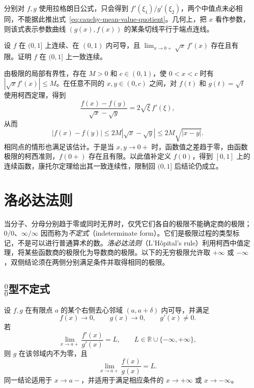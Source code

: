 \documentclass[UTF8,12pt,a4paper,fontset=fandol]{ctexbook}
\begin{document}
分别对 $f,g$ 使用拉格朗日公式，只会得到 $f'(\xi_1)/g'(\xi_2)$，两个中值点未必相同，不能据此推出式~\eqref{eq:cauchy-mean-value-quotient}。几何上，把 $x$ 看作参数，则该式表示参数曲线 $(g(x),f(x))$ 的某条切线平行于端点连线。

\begin{example}
\label{ex:cauchy-mean-value-weighted-derivative}
设 $f$ 在 $(0,1]$ 上连续、在 $(0,1)$ 内可导，且 $\lim_{x\to0+}\sqrt{x}\,f'(x)$ 存在且有限。证明 $f$ 在 $(0,1]$ 上一致连续。
\end{example}

\begin{solve}
由极限的局部有界性，存在 $M>0$ 和 $c\in(0,1)$，使 $0<x<c$ 时有 $|\sqrt{x}f'(x)|\leq M$。在任意不同的 $x,y\in(0,c)$ 之间，对 $f(t)$ 和 $g(t)=\sqrt{t}$ 使用柯西定理，得到
\[
    \frac{f(x)-f(y)}{\sqrt{x}-\sqrt{y}}=2\sqrt{\xi}\,f'(\xi),
\]
从而
\[
    |f(x)-f(y)|\leq2M|\sqrt{x}-\sqrt{y}|
    \leq2M\sqrt{|x-y|}.
\]
相同点的情形也满足该估计。于是当 $x,y\to0+$ 时，函数值之差趋于零，由函数极限的柯西准则，$f(0+)$ 存在且有限。以此值补定义 $f(0)$，得到 $[0,1]$ 上的连续函数，康托尔定理给出其一致连续性，限制回 $(0,1]$ 后结论仍成立。
\end{solve}

\section{洛必达法则}
\label{sec:lhopital-rule}

当分子、分母分别趋于零或同时无界时，仅凭它们各自的极限不能确定商的极限；$0/0$、$\infty/\infty$ 因而称为\emph{不定式}（indeterminate form）。它们是极限过程的类型标记，不是可以进行普通算术的数。\emph{洛必达法则}（L'H\^opital's rule）利用柯西中值定理，将某些函数商的极限化为导数商的极限。以下的无穷极限允许取 $+\infty$ 或 $-\infty$，双侧结论须在两侧分别满足条件并取得相同的极限。

\subsection{\texorpdfstring{$\frac{0}{0}$}{0/0}型不定式}
\label{subsec:zero-over-zero-indeterminate-form}

\begin{theorem}[$0/0$ 型洛必达法则]
\label{thm:lhopital-zero-over-zero}
设 $f,g$ 在有限点 $a$ 的某个右侧去心邻域 $(a,a+\delta)$ 内可导，并满足
\[
    f(x)\to0,\qquad g(x)\to0,\qquad g'(x)\neq0.
\]
若
\[
    \lim_{x\to a+}\frac{f'(x)}{g'(x)}=L,
    \qquad L\in\mathbb{R}\cup\{-\infty,+\infty\},
\]
则 $g$ 在该邻域内不为零，且
\begin{equation}
    \lim_{x\to a+}\frac{f(x)}{g(x)}=L.
    \label{eq:lhopital-zero-over-zero}
\end{equation}
同一结论适用于 $x\to a-$，并适用于满足相应条件的 $x\to+\infty$ 或 $x\to-\infty$。
\end{theorem}
\end{document}
